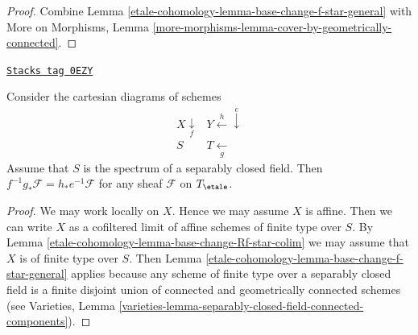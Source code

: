 \begin{proof}
Combine Lemma \ref{etale-cohomology-lemma-base-change-f-star-general} with
More on Morphisms, Lemma
\ref{more-morphisms-lemma-cover-by-geometrically-connected}.
\end{proof}

\begin{lemma}
\label{etale-cohomology-lemma-base-change-f-star-field}
\href{https://stacks.math.columbia.edu/tag/0EZY}{\texttt{Stacks tag 0EZY}}

Consider the cartesian diagrams of schemes
$$
\begin{array}{cc}X \underset{f}{\downarrow} & Y \overset{h}{\longleftarrow}\overset{e}{\downarrow} \\ S & T \underset{g}{\longleftarrow}\end{array}
$$
Assume that $S$ is the spectrum of a separably closed field.
Then $f^{-1}g_*\mathcal{F} = h_*e^{-1}\mathcal{F}$
for any sheaf $\mathcal{F}$ on $T_\etale$.
\end{lemma}

\begin{proof}
We may work locally on $X$. Hence we may assume $X$ is affine.
Then we can write $X$ as a cofiltered limit of affine schemes of
finite type over $S$. By Lemma \ref{etale-cohomology-lemma-base-change-Rf-star-colim}
we may assume that $X$ is of finite type over $S$.
Then Lemma \ref{etale-cohomology-lemma-base-change-f-star-general}
applies because any scheme of finite
type over a separably closed field is a finite disjoint
union of connected and geometrically connected schemes
(see Varieties, Lemma
\ref{varieties-lemma-separably-closed-field-connected-components}).
\end{proof}


